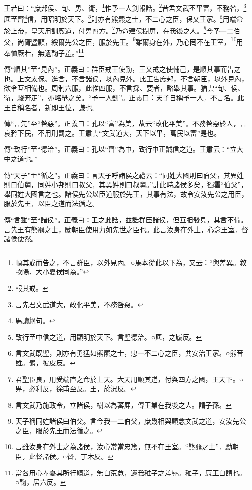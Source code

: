 王若曰：“庶邦侯、甸、男、衛，\footnote{順其戒而告之，不言群臣，以外見內。○馬本從此以下為，又云：“與差異。敘歐陽、大小夏侯同為。”}惟予一人釗報誥。\footnote{報其戒。}昔君文武丕平富，不務咎，\footnote{言先君文武道大，政化平美，不務咎惡。}厎至齊\footnote{馬讀絕句。}信，用昭明於天下。\footnote{致行至中信之道，用顯明於天下。言聖德治。○厎，之履反。}則亦有熊羆之士，不二心之臣，保乂王家。\footnote{言文武既聖，則亦有勇猛如熊羆之士，忠一不二心之臣，共安治王家。○熊音雄。羆，彼皮反。}用端命於上帝，皇天用訓厥道，付畀四方。\footnote{君聖臣良，用受端直之命於上天。大天用順其道，付與四方之國，王天下。○畀，必利反，徐甫至反。王，於況反。}乃命建侯樹屏，在我後之人。\footnote{言文武乃施政令，立諸侯，樹以為蕃屏，傳王業在我後之人。謂子孫。}今予一二伯父，尚胥暨顧，綏爾先公之臣，服於先王。\footnote{天子稱同姓諸侯曰伯父。言今我一二伯父，庶幾相與顧念文武之道，安汝先公之臣，服於先王而法循之。}雖爾身在外，乃心罔不在王室，\footnote{言雖汝身在外士之為諸侯，汝心常當忠篤，無不在王室。“熊羆之士”，勵朝臣，此督諸侯。○督，丁木反。}用奉恤厥若，無遺鞠子羞。”\footnote{當各用心奉憂其所行順道，無自荒怠，遺我稚子之羞辱。稚子，康王自謂也。○鞠，居六反。}


{\noindent\zhuan{}\fzbyks 傳“順其”至“見內”。正義曰：群臣戒王使勤，王又戒之使輔己，是順其事而告之也。上文太保、進言，不言諸侯，以內見外。此王告庶邦，不言朝臣，以外見內，欲令互相備也。周制六服，此惟四服，不言採、要者，略舉其事。猶雲“甸、侯、衛，駿奔走”，亦略舉之矣。“予一人釗”。正義曰：天子自稱予一人，不言名。此王自稱名者，新即王位，謙也。 \par}

{\noindent\zhuan{}\fzbyks 傳“言先”至“咎惡”。正義曰：孔以“富”為美，故云“政化平美”。不務咎惡於人，言哀矜下民，不用刑罰之。王肅雲“文武道大，天下以平，萬民以富”是也。 \par}

{\noindent\zhuan{}\fzbyks 傳“致行”至“德洽”。正義曰：孔以“齊”為中，致行中正誠信之道。王肅云：“立大中之道也。” \par}

{\noindent\zhuan{}\fzbyks 傳“天子”至“循之”。正義曰：言天子呼諸侯之禮云：“同姓大國則曰伯父，其異姓則曰伯舅，同姓小邦則曰叔父，其異姓則曰叔舅。”計此時諸侯多矣，獨雲“伯父”，舉同姓大國言之也。諸侯先公以臣道服於先王，其事有法，故令安汝先公之用臣，服於先王，以臣之道而法循之。 \par}

{\noindent\zhuan{}\fzbyks 傳“言雖”至“諸侯”。正義曰：王之此誥，並誥群臣諸侯，但互相發見，其言不備。言先王有熊羆之士，勵朝臣使用力如先世之臣也。此言汝身在外土，心念王室，督諸侯使然。 \par}

